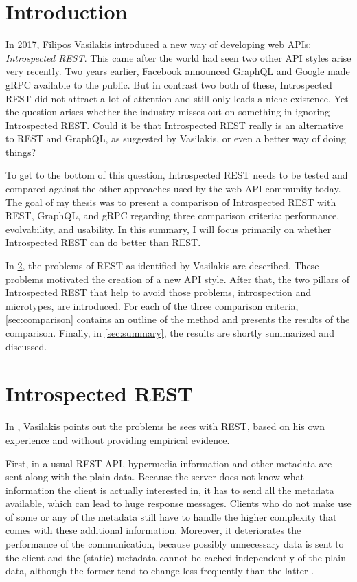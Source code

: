 \section{Introduction}\label{sec:introduction}

In 2017, Filipos Vasilakis introduced a new way of developing web APIs: \emph{Introspected REST}. This came after the world had seen two other API styles arise very recently. Two years earlier, Facebook announced GraphQL and Google made gRPC available to the public. But in contrast two both of these, Introspected REST did not attract a lot of attention and still only leads a niche existence. Yet the question arises whether the industry misses out on something in ignoring Introspected REST. Could it be that Introspected REST really is an alternative to REST and GraphQL, as suggested by Vasilakis, or even a better way of doing things?

To get to the bottom of this question, Introspected REST needs to be tested and compared against the other approaches used by the web API community today. The goal of my thesis was to present a comparison of Introspected REST with REST, GraphQL, and gRPC regarding three comparison criteria: performance, evolvability, and usability. In this summary, I will focus primarily on whether Introspected REST can do better than REST\@.

In \cref{sec:introspected_rest}, the problems of REST as identified by Vasilakis are described. These problems motivated the creation of a new API style. After that, the two pillars of Introspected REST that help to avoid those problems, introspection and microtypes, are introduced. For each of the three comparison criteria, \cref{sec:comparison} contains an outline of the method and presents the results of the comparison. Finally, in \cref{sec:summary}, the results are shortly summarized and discussed.

\section{Introspected REST}\label{sec:introspected_rest}

In \autocite[sec.~8.2]{Vasilakis2017}, Vasilakis points out the problems he sees with REST, based on his own experience and without providing empirical evidence.

First, in a usual REST API, hypermedia information and other metadata are sent along with the plain data. Because the server does not know what information the client is actually interested in, it has to send all the metadata available, which can lead to huge response messages. Clients who do not make use of some or any of the metadata still have to handle the higher complexity that comes with these additional information. Moreover, it deteriorates the performance of the communication, because possibly unnecessary data is sent to the client and the (static) metadata cannot be cached independently of the plain data, although the former tend to change less frequently than the latter \autocite[secs.~8.2.1-8.2.4]{Vasilakis2017}.

